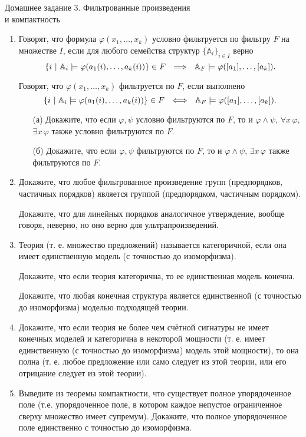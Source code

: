 \documentclass[a4paper,11pt]{article}
\begin{document}
\begin{center}
	\Large Домашнее задание 3. Фильтрованные произведения \\ и компактность
\end{center}

\begin{enumerate}
	\item Говорят, что формула $\varphi(x_1,\ldots,x_k)$ условно фильтруется по фильтру $F$ на множестве $I$, если для любого семейства структур $\{\mathbb{A}_i\}_{i\in I}$ верно
	\[ \set*{i\ \middle\vert\ \mathbb{A}_i\models \varphi\lr*{a_1(i),\ldots,a_k(i)}}\in F\ \ \Lra\ \ 
	    \mathbb{A}_F\models\varphi\lr*{\segment*{a_1},\ldots,\segment*{a_k}}.\]

Говорят, что  $\varphi(x_1,\ldots,x_k)$  фильтруется по $F$, если выполнено
	\[ \set*{i\ \middle\vert\ \mathbb{A}_i\models \varphi\lr*{a_1(i),\ldots,a_k(i)}}\in F
	    \ \ \Longleftrightarrow\ \ 
	    \mathbb{A}_F\models\varphi\lr*{\segment*{a_1},\ldots,\segment*{a_k}}.\]

    \begin{enumerate}
        \item[(а)] Докажите, что если $\varphi,\psi$ условно фильтруются по $F$, то и $\varphi\land\psi$, $\forall x\,\varphi$, $\exists x\,\varphi$ также условно фильтруются по $F$. 

        \item[(б)] Докажите, что если $\varphi,\psi$  фильтруются по $F$, то и $\varphi\land\psi$, $\exists x\,\varphi$ также  фильтруются по $F$.
    \end{enumerate}


	\item Докажите, что любое фильтрованное произведение групп (предпорядков, частичных порядков) является группой (предпорядком, частичным порядком). 

Докажите, что для линейных порядков аналогичное утверждение, вообще говоря, неверно, но оно верно для ультрапроизведений.


	\item Теория (т. е. множество предложений) называется категоричной, если она имеет единственную модель (с точностью до изоморфизма). 

Докажите, что если теория категорична, то ее единственная модель конечна. 

Докажите, что любая конечная структура является единственной (с точностью до изоморфизма) моделью подходящей теории.


	\item Докажите, что если теория не более чем счётной сигнатуры не имеет конечных моделей и категорична в некоторой мощности (т. е.  имеет единственную (с точностью до изоморфизма) модель этой мощности), то она полна (т. е. любое предложение или само следует из этой теории, или его отрицание следует из этой теории).


	\item Выведите из теоремы компактности, что существует полное упорядоченное поле (т.е. упорядоченное поле, в котором каждое непустое ограниченное сверху множество имеет супремум). Докажите, что полное упорядоченное поле единственно с точностью до изоморфизма.

\end{enumerate}
\end{document}
